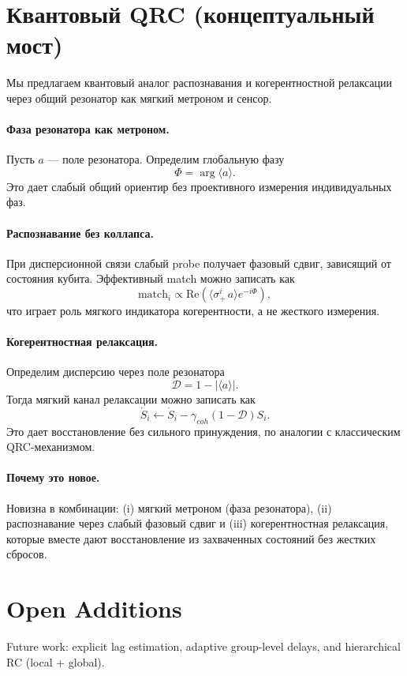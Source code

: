 ﻿\documentclass[12pt,a4paper]{article}
\begin{document}
\section{Квантовый QRC (концептуальный мост)}
Мы предлагаем квантовый аналог распознавания и когерентностной релаксации через общий резонатор как мягкий метроном и сенсор.

\paragraph{Фаза резонатора как метроном.}
Пусть $a$ — поле резонатора. Определим глобальную фазу
\begin{equation}
\Phi = \arg\langle a\rangle.
\end{equation}
Это дает слабый общий ориентир без проективного измерения индивидуальных фаз.

\paragraph{Распознавание без коллапса.}
При дисперсионной связи слабый probe получает фазовый сдвиг, зависящий от состояния кубита. Эффективный match можно записать как
\begin{equation}
\mathrm{match}_i \propto \mathrm{Re}\left(\langle \sigma_+^i\, a\rangle e^{-i\Phi}\right),
\end{equation}
что играет роль мягкого индикатора когерентности, а не жесткого измерения.

\paragraph{Когерентностная релаксация.}
Определим дисперсию через поле резонатора
\begin{equation}
\mathcal{D}=1-\left|\langle a\rangle\right|.
\end{equation}
Тогда мягкий канал релаксации можно записать как
\begin{equation}
\dot S_i \leftarrow \dot S_i - \gamma_{coh}(1-\mathcal{D})S_i.
\end{equation}
Это дает восстановление без сильного принуждения, по аналогии с классическим QRC-механизмом.

\paragraph{Почему это новое.}
Новизна в комбинации: (i) мягкий метроном (фаза резонатора), (ii) распознавание через слабый фазовый сдвиг и (iii) когерентностная релаксация, которые вместе дают восстановление из захваченных состояний без жестких сбросов.

\section*{Open Additions}
Future work: explicit lag estimation, adaptive group-level delays, and hierarchical RC (local + global).
\end{document}
